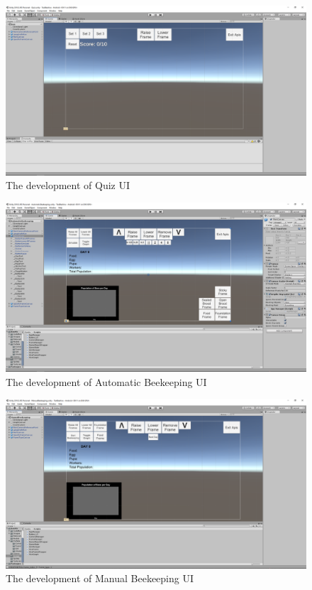 \documentclass[journal]{./IEEE/IEEEtran}
\begin{document}
\begin{figure}[H]
\includegraphics[scale=0.15]{./images/new-quiz-ui.png}
\centering
\caption{The development of Quiz UI}
\centering
\end{figure}

\begin{figure}[H]
\includegraphics[scale=0.15]{./images/ui-auto-v2.png}
\centering
\caption{The development of Automatic Beekeeping UI}
\centering
\end{figure}

\begin{figure}[H]
\includegraphics[scale=0.15]{./images/ui-manual.png}
\centering
\caption{The development of Manual Beekeeping  UI}
\centering
\end{figure}
\end{document}
